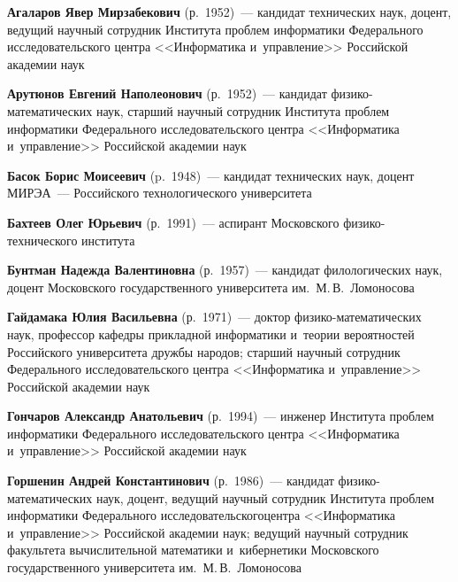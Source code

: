 \begin{multicols}{2}


\noindent
\textbf{Агаларов Явер Мирзабекович} (р.\ 1952)~--- 
кандидат технических наук, доцент, ведущий научный сотрудник 
Института проб\-лем информатики Федерального исследовательского центра 
<<Информатика и~управ\-ле\-ние>> Российской академии наук

\vspace*{3pt}

\noindent
\textbf{Арутюнов Евгений Наполеонович} (р.\ 1952)~--- 
кандидат фи\-зи\-ко-ма\-те\-ма\-ти\-че\-ских наук, старший научный со\-труд\-ник 
Института проб\-лем информатики Федерального исследовательского центра 
<<Информатика и~управ\-ле\-ние>> Российской академии наук

\vspace*{3pt}

\noindent
\textbf{Басок Борис Моисеевич} (p.\ 1948)~--- 
кандидат технических наук, доцент МИРЭА~--- Российского технологического университета 


\vspace*{3pt}

\noindent
\textbf{Бахтеев Олег Юрьевич} (р.\ 1991)~--- 
аспирант Мос\-ков\-ского фи\-зи\-ко-тех\-ни\-че\-ско\-го института

\noindent
\textbf{Бунтман Надежда Валентиновна} (р.\ 1957)~--- 
кандидат филологических наук, доцент Московского государственного университета им.\  
М.\,В.~Ломоносова


\vspace*{3pt}


\noindent
\textbf{Гайдамака Юлия Васильевна} (р.\ 1971)~--- 
доктор фи\-зи\-ко-ма\-те\-ма\-ти\-че\-ских наук, профессор 
кафедры прикладной информатики и~теории вероятностей
Российского университета 
дружбы народов; старший научный со\-труд\-ник Федерального исследовательского центра 
<<Информатика и~управ\-ле\-ние>> Российской академии наук


\vspace*{3pt}

\noindent
\textbf{Гончаров Александр Анатольевич} (р.\ 1994)~--- 
инженер Института проб\-лем информатики Федерального исследовательского центра 
<<Информатика и~управ\-ле\-ние>> Российской академии наук


\vspace*{3pt}

\noindent
\textbf{Горшенин Андрей Константинович} (р.\ 1986)~--- 
кандидат фи\-зи\-ко-ма\-те\-ма\-ти\-че\-ских наук, доцент, ведущий научный 
со\-труд\-ник Института проб\-лем информатики Федерального исследовательского\linebreak центра 
<<Информатика и~управ\-ле\-ние>> Российской академии наук; 
ведущий научный сотрудник факультета
вычислительной математики и~кибернетики Московского государственного 
университета им.\ М.\,В.~Ломоносова



\end{multicols}
